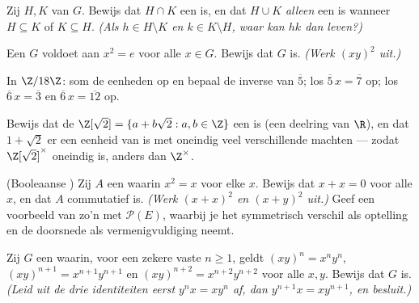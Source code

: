 \begin{exercise}[$\star\star$]\label{exo:b1:structures:6}
Zij $H, K$  van $G$. Bewijs dat $H \cap K$ een  is,
en dat $H \cup K$ \emph{alleen} een  is wanneer $H \subseteq K$
of $K \subseteq H$. \emph{(Als $h \in H \setminus K$ en $k \in K \setminus
H$, waar kan $hk$ dan leven?)}
\end{exercise}

\begin{exercise}[$\star\star$]\label{exo:b1:structures:7}
Een  $G$ voldoet aan $x^2 = e$ voor alle $x \in G$. Bewijs dat $G$
 is. \emph{(Werk $(xy)^2$ uit.)}
\end{exercise}

\begin{exercise}[$\star\star$]\label{exo:b1:structures:8}
In $\Z/18\Z$: som de eenheden op en bepaal de inverse van $\overline 5$;
los $\overline 5\, x = \overline 7$ op; los $\overline 6\, x = \overline
3$ en $\overline 6\, x = \overline{12}$ op.
\end{exercise}

\begin{exercise}[$\star\star$]\label{exo:b1:structures:9}
Bewijs dat de  $\Z[\sqrt 2] = \{a + b\sqrt 2 : a, b \in \Z\}$
een  is (een deelring van $\R$), en dat $1 + \sqrt 2$ er een eenheid
van is met oneindig veel verschillende machten --- zodat $\Z[\sqrt
2]^\times$ oneindig is, anders dan $\Z^\times$.
\end{exercise}

\begin{exercise}[$\star\star\star$]\label{exo:b1:structures:10}
(Booleaanse ) Zij $A$ een  waarin $x^2 = x$ voor elke $x$.
Bewijs dat $x + x = 0$ voor alle $x$, en dat $A$ commutatief is.
\emph{(Werk $(x+x)^2$ en $(x+y)^2$ uit.)} Geef een voorbeeld van zo'n 
met $\mathcal{P}(E)$, waarbij je het symmetrisch verschil als optelling en
de doorsnede als vermenigvuldiging neemt.
\end{exercise}

\begin{exercise}[$\star\star\star$]\label{exo:b1:structures:11}
Zij $G$ een  waarin, voor een zekere vaste $n \geq 1$, geldt $(xy)^n
= x^n y^n$, $(xy)^{n+1} = x^{n+1}y^{n+1}$ en $(xy)^{n+2} =
x^{n+2}y^{n+2}$ voor alle $x, y$. Bewijs dat $G$  is. \emph{(Leid uit
de drie identiteiten eerst $y^n x = x y^n$ af, dan $y^{n+1} x = x
y^{n+1}$, en besluit.)}
\end{exercise}

